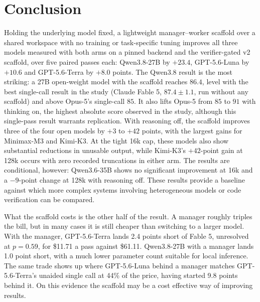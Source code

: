 \documentclass[11pt]{article}
\begin{document}
\section{Conclusion}

Holding the underlying model fixed, a lightweight manager--worker scaffold over a shared 
workspace with no training or task-specific tuning improves all three models measured with
both arms on a pinned backend and the verifier-gated v2 scaffold, over five paired passes
each: Qwen3.8-27B by $+23.4$, GPT-5.6-Luna by $+10.6$ and GPT-5.6-Terra by $+8.0$ points. The Qwen3.8 result is
the most striking: a 27B open-weight model
with the scaffold reaches $86.4$, level with the best single-call result in the study
(Claude Fable 5, $87.4 \pm 1.1$, run without any scaffold) and above Opus-5's single-call
$85$. It also lifts Opus-5 from $85$ to $91$ with thinking on, the highest absolute score
observed in the study, although this single-pass result warrants replication. With reasoning off,
the scaffold improves three of the four open models by $+3$ to $+42$ points, with the 
largest gains for Minimax-M3 and Kimi-K3. At the tight 16k cap, these models also show 
substantial reductions in unusable output, while Kimi-K3's $+42$-point gain at 128k occurs 
with zero recorded truncations in either arm. The results are conditional, however: 
Qwen3.6-35B shows no significant improvement at 16k and a $-9$-point change at 128k with
reasoning off. These results
provide a baseline against which more complex systems involving heterogeneous models or code
verification can be compared.

What the scaffold costs is the other half of the result. A manager roughly triples the bill, but in many cases it is still cheaper than switching to a larger model. With the manager, GPT-5.6-Terra lands 2.4 points short of Fable 5, unresolved at $p = 0.59$, for \$11.71 a pass against \$61.11. Qwen3.8-27B with a manager lands 1.0 point short, with a much lower parameter count suitable for local inference. The same trade shows up where GPT-5.6-Luna behind a manager matches GPT-5.6-Terra's unaided single call at 44\% of the
price, having started 9.8 points behind it. On this evidence the scaffold may be a cost effective way of improving results.
\end{document}
